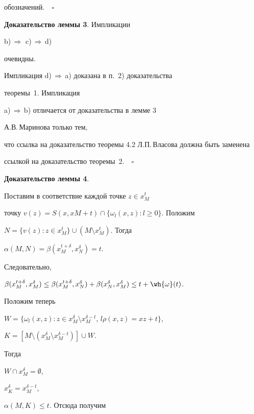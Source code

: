 обозначений.$\quad\square$


\medskip





{\bf Доказательство леммы 3}. Импликации


b)\,$\Rightarrow\,$\,c)\,$\Rightarrow$\,d)


очевидны.


Импликация d)\,$\Rightarrow\,$a) доказана в п.~2) доказательства


теоремы~1. Импликация


a)\,$\Rightarrow\,$b) отличается от доказательства в лемме 3


А.В.\,Ма\-ри\-но\-ва только тем,


что ссылка на доказательство теоремы 4.2 Л.П.\,Власова должна быть заменена


ссылкой на доказательство теоремы~2.$\quad\square$





{\bf Доказательство леммы 4}.


Поставим в соответствие каждой точке $z \in x_{M}^{t}$ 


точку $v(z) = S(x,xM +t)\cap \{\omega _{l}(x,z) : l \geq 0 \}$. Положим 


$N = \{v(z) : z \in x_{M}^{t} \} \cup (M\setminus x_{M}^{t})$. Тогда 


$\alpha (M,N) = \beta (x_{M}^{t + \delta},x_{N}^{\delta }) = t$.


Следовательно,


$\beta (x_{M}^{t + \delta},x_{M}^{\delta }) \leq


\beta (x_{M}^{t + \delta},x_{N}^{\delta }) +


\beta (x_{N}^{\delta},x_{M}^{\delta }) \leq t + \wh {\omega}(t)$.





Положим теперь


$W = \{\omega _{l}(x,z) : z \in x_{M}^{\delta }


\setminus x_{M}^{\delta - t}$, $l\rho (x,z) = xz + t \}$,


$K = [M\setminus (x_{M}^{\delta } \setminus x_{M}^{\delta - t})]\cup W$.


Тогда 


$W\cap x_{M}^{\delta } = \emptyset $,


$x_{K}^{\delta } = x_{M}^{\delta - t} $, 


$\alpha (M,K) \leq t$. Отсюда получим 



